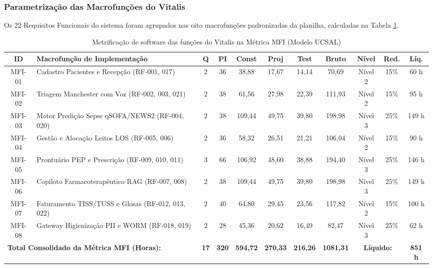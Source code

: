 \subsubsection{Parametrização das Macrofunções do Vitalis}

Os 22 Requisitos Funcionais do sistema foram agrupados nas oito macrofunções padronizadas da planilha, calculadas na Tabela \ref{tab:mfi_vitalis}.

\begin{table}[H]
\centering
\scriptsize
\setlength{\tabcolsep}{2.5pt}
\caption{Metrificação de software das funções do Vitalis na Métrica MFI (Modelo UCSAL)}
\label{tab:mfi_vitalis}
\begin{tabularx}{\textwidth}{c >{\raggedright\arraybackslash}X *{9}{c}}
\toprule
\textbf{ID} & \textbf{Macrofunção de Implementação} & \textbf{Q} & \textbf{PI} & \textbf{Const} & \textbf{Proj} & \textbf{Test} & \textbf{Bruto} & \textbf{Nível} & \textbf{Red.} & \textbf{Líq.} \\
\midrule
MFI-01 & Cadastro Pacientes e Recepção (RF-001, 017)        & 2 & 36 &  38,88 & 17,67 & 14,14 &  70,69 & Nível 2 & 15\% &  60 h \\
MFI-02 & Triagem Manchester com Voz (RF-002, 003, 021)      & 2 & 38 &  61,56 & 27,98 & 22,39 & 111,93 & Nível 2 & 15\% &  95 h \\
MFI-03 & Motor Predição Sepse qSOFA/NEWS2 (RF-004, 020)     & 2 & 38 & 109,44 & 49,75 & 39,80 & 198,98 & Nível 3 & 25\% & 149 h \\
MFI-04 & Gestão e Alocação Leitos LOS (RF-005, 006)         & 2 & 36 &  58,32 & 26,51 & 21,21 & 106,04 & Nível 2 & 15\% &  90 h \\
MFI-05 & Prontuário PEP e Prescrição (RF-009, 010, 011)     & 3 & 66 & 106,92 & 48,60 & 38,88 & 194,40 & Nível 3 & 25\% & 146 h \\
MFI-06 & Copiloto Farmacoterapêutico RAG (RF-007, 008)      & 2 & 38 & 109,44 & 49,75 & 39,80 & 198,98 & Nível 3 & 25\% & 149 h \\
MFI-07 & Faturamento TISS/TUSS e Glosas (RF-012, 013, 022)   & 2 & 40 &  64,80 & 29,45 & 23,56 & 117,82 & Nível 2 & 15\% & 100 h \\
MFI-08 & Gateway Higienização PII e WORM (RF-018, 019)     & 2 & 28 &  45,36 & 20,62 & 16,49 &  82,47 & Nível 3 & 25\% &  62 h \\
\midrule
\multicolumn{2}{l}{\textbf{Total Consolidado da Métrica MFI (Horas):}} & \textbf{17} & \textbf{320} & \textbf{594,72} & \textbf{270,33} & \textbf{216,26} & \textbf{1081,31} & \multicolumn{2}{c}{\textbf{Líquido:}} & \textbf{851 h} \\
\bottomrule
\end{tabularx}
\end{table}

